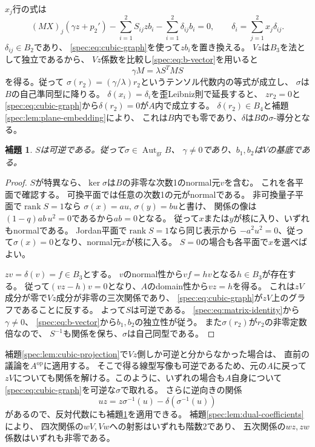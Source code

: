 \documentclass[11pt,a4paper]{ltjsarticle}
\newtheorem{lemma}[theorem]{補題}
\theoremstyle{definition}
\newcommand{\Aut}{\operatorname{Aut}}
\newcommand{\rk}{\operatorname{rank}}
\begin{document}
$x_j$行の式は
\[
(MX)_j(\gamma z+p_2')
-\sum_{i=1}^2 S_{ij}zb_i
-\sum_{i=1}^2\delta_{ij}b_i=0,
\qquad
\delta_i=\sum_{j=1}^2x_j\delta_{ij}.
\]
$\delta_{ij}\in B_2$であり、
\eqref{spec:eq:cubic-graph}を使って$zb_i$を置き換える。
$Vz$は$B_3$を法として独立であるから、
$Vz$係数を比較し\eqref{spec:eq:b-vector}を用いると
\begin{equation}\label{spec:eq:matrix-identity}
\gamma M=\lambda S^TMS
\end{equation}
を得る。従って
$\sigma(r_2)=(\gamma/\lambda)r_2$というテンソル代数内の等式が成立し、
$\sigma$は$B$の自己準同型に降りる。
$\delta(x_i)=\delta_i$を歪Leibniz則で延長すると、
$zr_2=0$と\eqref{spec:eq:cubic-graph}から$\delta(r_2)=0$が$A$内で成立する。
$\delta(r_2)\in B_4$と補題\ref{spec:lem:plane-embedding}により、
これは$B$内でも零であり、$\delta$は$B$の$\sigma$-導分となる。

\begin{lemma}\label{spec:lem:first-automorphism}
$S$は可逆である。従って$\sigma\in\Aut_{\mathrm{gr}}B$、
$\gamma\ne0$であり、$b_1,b_2$は$V$の基底である。
\end{lemma}
\begin{proof}
$S$が特異なら、$\ker\sigma$は$B$の非零な次数1のnormal元$v$を含む。
これを各平面で確認する。
可換平面では任意の次数1の元がnormalである。
非可換量子平面で$\rk S=1$なら
$\sigma(x)=a u$, $\sigma(y)=b u$と書け、
関係の像は$(1-q)ab\,u^2=0$であるから$ab=0$となる。
従って$x$または$y$が核に入り、いずれもnormalである。
Jordan平面で$\rk S=1$なら同じ表示から
$-a^2u^2=0$、従って$\sigma(x)=0$となり、normal元$x$が核に入る。
$S=0$の場合も各平面で$x$を選べばよい。

$zv=\delta(v)=f\in B_3$とする。
$v$のnormal性から$vf=hv$となる$h\in B_3$が存在する。
従って$(vz-h)v=0$となり、$A$のdomain性から$vz=h$を得る。
これは$zV$成分が零で$Vz$成分が非零の三次関係であり、
\eqref{spec:eq:cubic-graph}が$zV$上のグラフであることに反する。
よって$S$は可逆である。
\eqref{spec:eq:matrix-identity}から$\gamma\ne0$、
\eqref{spec:eq:b-vector}から$b_1,b_2$の独立性が従う。
また$\sigma(r_2)$が$r_2$の非零定数倍なので、
$S^{-1}$も関係を保ち、$\sigma$は自己同型である。
\end{proof}

補題\ref{spec:lem:cubic-projection}で$Vz$側しか可逆と分からなかった場合は、
直前の議論を$A^{\mathrm{op}}$に適用する。
そこで得る線型写像も可逆であるため、元の$A$に戻って
$zV$についても関係を解ける。このように、いずれの場合も$A$自身について
\eqref{spec:eq:cubic-graph}を可逆な$\sigma$で取れる。
さらに逆向きの関係
\[
uz=z\sigma^{-1}(u)-\delta(\sigma^{-1}(u))
\]
があるので、反対代数にも補題\ref{spec:lem:first-automorphism}を適用できる。
補題\ref{spec:lem:dual-coefficients}により、
四次関係の$wV,Vw$への射影はいずれも階数2であり、
五次関係の$wz,zw$係数はいずれも非零である。
\end{document}
